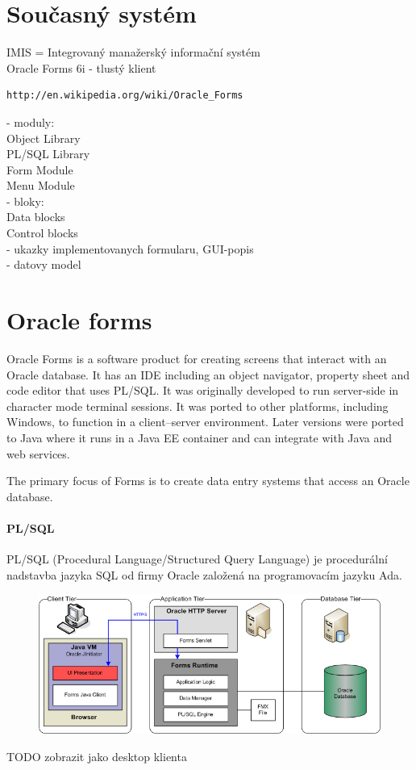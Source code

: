 \documentclass{bakalarka}
\begin{document}
\section{Současný systém}
IMIS = Integrovaný manažerský informační systém\\

Oracle Forms 6i - tlustý klient \\
\begin{verbatim}
http://en.wikipedia.org/wiki/Oracle_Forms
\end{verbatim}

- moduly:\\
Object Library\\
PL/SQL Library  \\
Form Module   \\
Menu Module\\
- bloky:\\
Data blocks\\
Control blocks\\

- ukazky implementovanych formularu, GUI-popis\\
- datovy model\\

\section{Oracle forms}
Oracle Forms is a software product for creating screens that interact with an Oracle database. It has an IDE including an object navigator, property sheet and code editor that uses PL/SQL. It was originally developed to run server-side in character mode terminal sessions. It was ported to other platforms, including Windows, to function in a client–server environment. Later versions were ported to Java where it runs in a Java EE container and can integrate with Java and web services.

The primary focus of Forms is to create data entry systems that access an Oracle database.

\paragraph{PL/SQL}
PL/SQL (Procedural Language/Structured Query Language) je procedurální nadstavba jazyka SQL od firmy Oracle založená na programovacím jazyku Ada.
\begin{figure}[H]
  \centering
  \includegraphics[scale=0.55]{obr/3tier.png}
  \label{}
\end{figure}
TODO zobrazit jako desktop klienta
\end{document}
